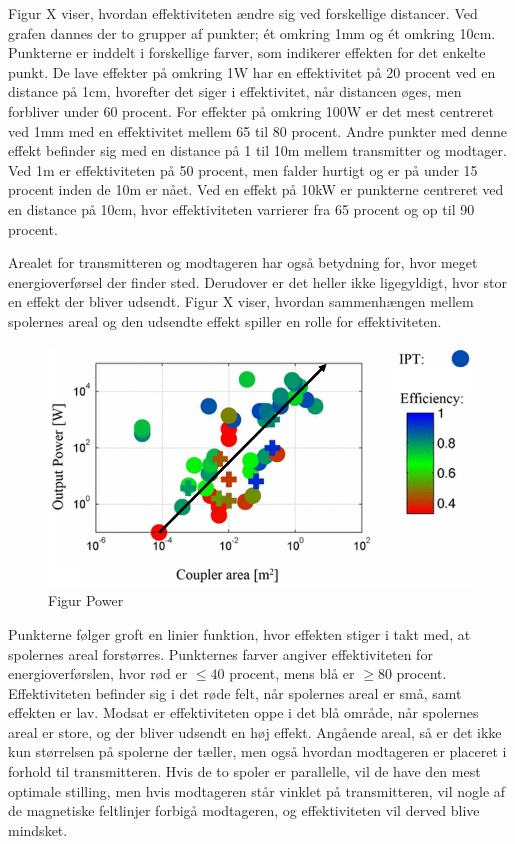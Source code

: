 Figur X viser, hvordan effektiviteten ændre sig ved forskellige distancer. Ved grafen dannes der to grupper af punkter; ét omkring 1mm og ét omkring 10cm. Punkterne er inddelt i forskellige farver, som indikerer effekten for det enkelte punkt. De lave effekter på omkring 1W har en effektivitet på 20 procent ved en distance på 1cm, hvorefter det siger i effektivitet, når distancen øges, men forbliver under 60 procent. For effekter på omkring 100W er det mest centreret ved 1mm med en effektivitet mellem 65 til 80 procent. Andre punkter med denne effekt befinder sig med en distance på 1 til 10m mellem transmitter og modtager. Ved 1m er effektiviteten på 50 procent, men falder hurtigt og er på under 15 procent inden de 10m er nået. Ved en effekt på 10kW er punkterne centreret ved en distance på 10cm, hvor effektiviteten varrierer fra 65 procent og op til 90 procent.

Arealet for transmitteren og modtageren har også betydning for, hvor meget energioverførsel der finder sted. Derudover er det heller ikke ligegyldigt, hvor stor en effekt der bliver udsendt. Figur X viser, hvordan sammenhængen mellem spolernes areal og den udsendte effekt spiller en rolle for effektiviteten.

\begin{figure}[H]
\centering
\includegraphics[scale=0.5]{Vildledning/Schematics/Power_vs_coupler-area.png}
\caption{Figur Power}
\end{figure}

Punkterne følger groft en linier funktion, hvor effekten stiger i takt med, at spolernes areal forstørres. Punkternes farver angiver effektiviteten for energioverførslen, hvor rød er $\leq 40$ procent, mens blå er $\geq 80$ procent. Effektiviteten befinder sig i det røde felt, når spolernes areal er små, samt effekten er lav. Modsat er effektiviteten oppe i det blå område, når spolernes areal er store, og der bliver udsendt en høj effekt. Angående areal, så er det ikke kun størrelsen på spolerne der tæller, men også hvordan modtageren er placeret i forhold til transmitteren. Hvis de to spoler er parallelle, vil de have den mest optimale stilling, men hvis modtageren står vinklet på transmitteren, vil nogle af de magnetiske feltlinjer forbigå modtageren, og effektiviteten vil derved blive mindsket.

